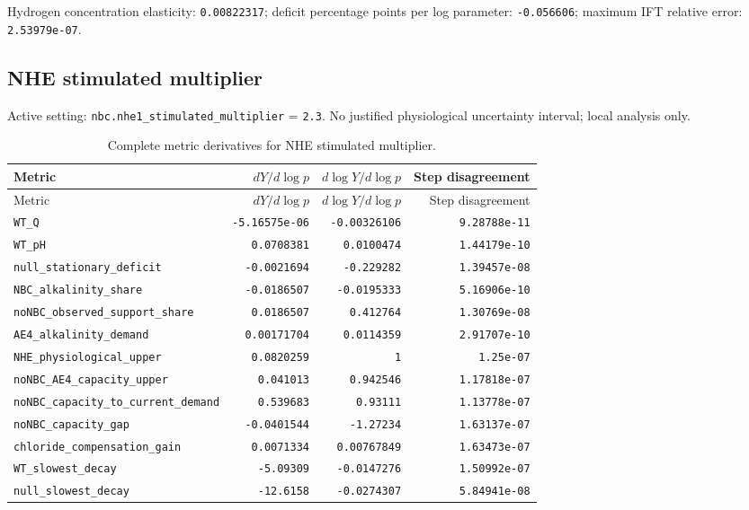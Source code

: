 Hydrogen concentration elasticity: \texttt{0.00822317}; deficit percentage points per log parameter: \texttt{-0.056606}; maximum IFT relative error: \texttt{2.53979e-07}.\par

\subsection*{NHE stimulated multiplier}
Active setting: \nolinkurl{nbc.nhe1_stimulated_multiplier} = \texttt{2.3}. No justified physiological uncertainty interval; local analysis only.


\begingroup\scriptsize
\setlength{\tabcolsep}{3pt}
\begin{longtable}{p{.44\linewidth}rrr}
\caption{Complete metric derivatives for NHE stimulated multiplier.}\\
\toprule
Metric & $dY/d\log p$ & $d\log Y/d\log p$ & Step disagreement \\
\midrule\endfirsthead
\toprule
Metric & $dY/d\log p$ & $d\log Y/d\log p$ & Step disagreement \\
\midrule\endhead
\bottomrule\endfoot
\nolinkurl{WT_Q} & \texttt{-5.16575e-06} & \texttt{-0.00326106} & \texttt{9.28788e-11} \\
\nolinkurl{WT_pH} & \texttt{0.0708381} & \texttt{0.0100474} & \texttt{1.44179e-10} \\
\nolinkurl{null_stationary_deficit} & \texttt{-0.0021694} & \texttt{-0.229282} & \texttt{1.39457e-08} \\
\nolinkurl{NBC_alkalinity_share} & \texttt{-0.0186507} & \texttt{-0.0195333} & \texttt{5.16906e-10} \\
\nolinkurl{noNBC_observed_support_share} & \texttt{0.0186507} & \texttt{0.412764} & \texttt{1.30769e-08} \\
\nolinkurl{AE4_alkalinity_demand} & \texttt{0.00171704} & \texttt{0.0114359} & \texttt{2.91707e-10} \\
\nolinkurl{NHE_physiological_upper} & \texttt{0.0820259} & \texttt{1} & \texttt{1.25e-07} \\
\nolinkurl{noNBC_AE4_capacity_upper} & \texttt{0.041013} & \texttt{0.942546} & \texttt{1.17818e-07} \\
\nolinkurl{noNBC_capacity_to_current_demand} & \texttt{0.539683} & \texttt{0.93111} & \texttt{1.13778e-07} \\
\nolinkurl{noNBC_capacity_gap} & \texttt{-0.0401544} & \texttt{-1.27234} & \texttt{1.63137e-07} \\
\nolinkurl{chloride_compensation_gain} & \texttt{0.0071334} & \texttt{0.00767849} & \texttt{1.63473e-07} \\
\nolinkurl{WT_slowest_decay} & \texttt{-5.09309} & \texttt{-0.0147276} & \texttt{1.50992e-07} \\
\nolinkurl{null_slowest_decay} & \texttt{-12.6158} & \texttt{-0.0274307} & \texttt{5.84941e-08} \\
\end{longtable}
\endgroup

